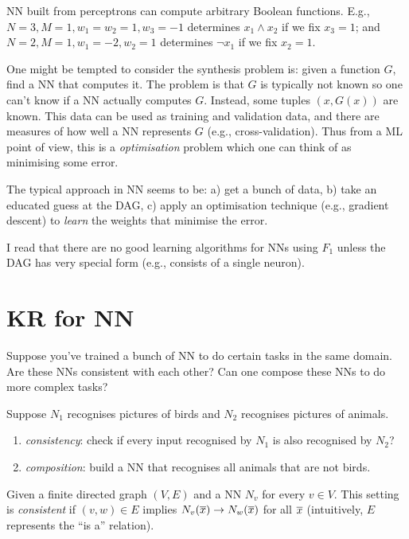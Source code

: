 \documentclass[a4paper,10pt]{article}
\begin{document}
\begin{fact}
 NN built from perceptrons can compute arbitrary Boolean functions. E.g., $N = 3, M = 1, w_1 = w_2 = 1, w_3 = -1$ determines $x_1 \wedge x_2$ if we fix $x_3 = 1$; and $N = 2, M = 1, w_1 = -2, w_2 = 1$ determines $\neg x_1$ if we fix $x_2 = 1$.
\end{fact}

One might be tempted to consider the synthesis problem is: given a function $G$, find a NN that computes it. The problem is that $G$ is typically not known so one can't know if a NN actually computes $G$. Instead, some tuples $(x,G(x))$ are known. This data can be used as training and validation data, and there are measures
of how well a NN represents $G$ (e.g., cross-validation). Thus from a ML point of view, this is a \emph{optimisation} problem which one can think of as minimising some error.

The typical approach in NN seems to be: a) get a bunch of data, b) take an 
educated guess at the DAG, c) apply an optimisation technique (e.g., gradient 
descent) to \emph{learn} the weights that minimise the error.

\begin{remark}
 I read that there are no good learning algorithms for NNs using $F_1$ unless the DAG has very special form (e.g., consists of a single neuron).
\end{remark}

\section{KR for NN}

Suppose you've trained a bunch of NN to do certain tasks in the same domain.
Are these NNs consistent with each other? Can one compose these NNs to do more complex tasks?

\begin{example}
Suppose $N_1$ recognises pictures of birds and $N_2$ recognises pictures of animals. 

\begin{enumerate}
 \item \emph{consistency}: check if every input recognised by $N_1$ is also recognised by $N_2$? 
 \item \emph{composition}: build a NN that recognises all animals that are not birds.
\end{enumerate}
\end{example}

\begin{definition}
 Given a finite directed graph $(V,E)$ and a NN $N_v$ for every $v \in V$. This setting is \emph{consistent} if $(v,w) \in E$ implies $N_v(\overline{x}) \to N_w(\overline{x})$ for all $\overline{x}$ (intuitively, $E$ represents the ``is a'' relation).
\end{definition}
\end{document}

